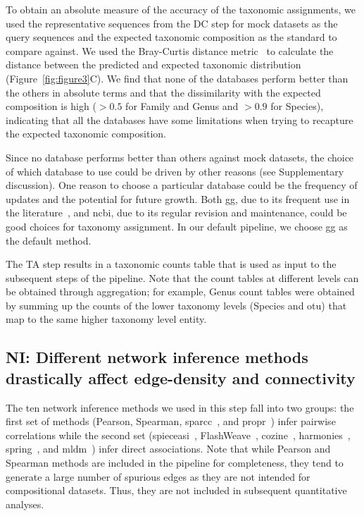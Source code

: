 \documentclass[letterpaper,12pt]{article}
\begin{document}
  To obtain an absolute measure of the accuracy of the taxonomic assignments, we used the representative sequences from the DC step for mock datasets as the query sequences and the expected taxonomic composition as the standard to compare against.
  We used the Bray-Curtis distance metric~\cite{virtanenSciPyFundamentalAlgorithms2020} to calculate the distance between the predicted and expected taxonomic distribution (Figure~\ref{fig:figure3}C).
  We find that none of the databases perform better than the others in absolute terms and that the dissimilarity with the expected composition is high ($>0.5$ for Family and Genus and $>0.9$ for Species), indicating that all the databases have some limitations when trying to recapture the expected taxonomic composition.

  Since no database performs better than others against mock datasets, the choice of which database to use could be driven by other reasons (see Supplementary discussion).
  One reason to choose a particular database could be the frequency of updates and the potential for future growth.
  Both \ac{gg}, due to its frequent use in the literature~\cite{Balvociute2017}, and \ac{ncbi}, due to its regular revision and maintenance, could be good choices for taxonomy assignment.
  In our default pipeline, we choose \ac{gg} as the default method.

  The TA step results in a taxonomic counts table that is used as input to the subsequent steps of the pipeline.
  Note that the count tables at different levels can be obtained through aggregation; for example, Genus count tables were obtained by summing up the counts of the lower taxonomy levels (Species and \ac{otu}) that map to the same higher taxonomy level entity.

  \FloatBarrier

  \subsection*{NI: Different network inference methods drastically affect edge-density and connectivity}

   The ten network inference methods we used in this step fall into two groups: the first set of methods (Pearson, Spearman, \acs{sparcc}~\cite{Friedman2012,Watts2018}, and propr~\cite{quinnProprRpackageIdentifying2017}) infer pairwise correlations while the second set (\acs{spieceasi}~\cite{Kurtz2015}, FlashWeave~\cite{tackmannRapidInferenceDirect2019}, \acs{cozine}~\cite{haCompositionalZeroinflatedNetwork2020a}, \acs{harmonies}~\cite{jiangHARMONIESHybridApproach2020}, \acs{spring}~\cite{yoonMicrobialNetworksSPRING2019}, and \acs{mldm}~\cite{Yang2017}) infer direct associations.
   Note that while Pearson and Spearman methods are included in the pipeline for completeness, they tend to generate a large number of spurious edges as they are not intended for compositional datasets.
   Thus, they are not included in subsequent quantitative analyses.
\end{document}
